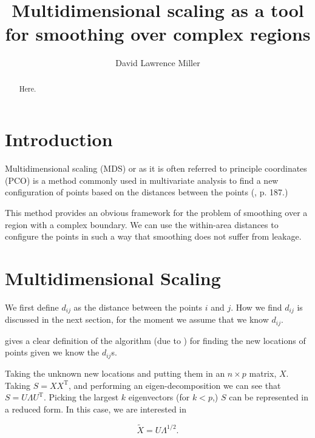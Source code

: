 \documentclass[a4paper,10pt]{amsart}
\title{Multidimensional scaling as a tool for smoothing over complex regions}
\author{David Lawrence Miller}
\newcommand{\tr}[1]{#1^{\text{T}}}
\begin{document}
 
\begin{abstract}
Here.
\end{abstract}
 
 
\newtheorem{thm}{Theorem}[section]
 
\newtheorem{defn}{Definition}[section]
 
\maketitle


\section{Introduction}

Multidimensional scaling (MDS) or as it is often referred to principle coordinates (PCO) is a method commonly used in multivariate analysis to find a new configuration of points based on the distances between the points (\cite{chatfieldcollins}, p. 187.)

This method provides an obvious framework for the problem of smoothing over a region with a complex boundary. We can use the within-area distances to configure the points in such a way that smoothing does not suffer from leakage.

\section{Multidimensional Scaling}

We first define $d_{ij}$ as the distance between the points $i$ and $j$. How we find $d_{ij}$ is discussed in the next section, for the moment we assume that we know $d_{ij}$.

\cite{diaconis08} gives a clear definition of the algorithm (due to \cite{schoenberg35}) for finding the new locations of points given we know the $d_{ij}$s. 

Taking the unknown new locations and putting them in an $n \times p$ matrix, $X$. Taking $S=X\tr{X}$, and performing an eigen-decomposition we can see that $S=U\Lambda\tr{U}$. Picking the largest $k$ eigenvectors (for $k<p$,) $S$ can be represented in a reduced form. In this case, we are interested in

\begin{equation}
\tilde{X}=U\Lambda^{1/2}.
\end{equation}
\end{document}
